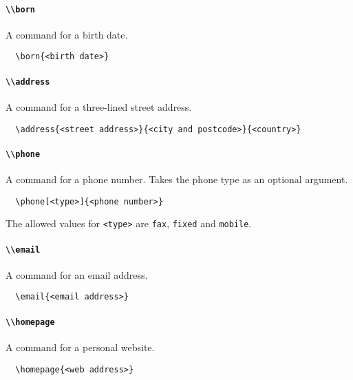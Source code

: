 \documentclass[a4paper, 11pt]{article}
\newcommand{\code}[1]{\lstinline!#1!}
\begin{document}
\paragraph{\code{\\born}}
A command for a birth date.
\begin{lstlisting}
  \born{<birth date>}
\end{lstlisting}

\paragraph{\code{\\address}}
A command for a three-lined street address.
\begin{lstlisting}
  \address{<street address>}{<city and postcode>}{<country>}
\end{lstlisting}

\paragraph{\code{\\phone}}
A command for a phone number. Takes the phone type as an optional argument.
\begin{lstlisting}
  \phone[<type>]{<phone number>}
\end{lstlisting}
The allowed values for \code{<type>} are \code{fax}, \code{fixed} and \code{mobile}.

\paragraph{\code{\\email}}
A command for an email address.
\begin{lstlisting}
  \email{<email address>}
\end{lstlisting}

\paragraph{\code{\\homepage}}
A command for a personal website.
\begin{lstlisting}
  \homepage{<web address>}
\end{lstlisting}
\end{document}

